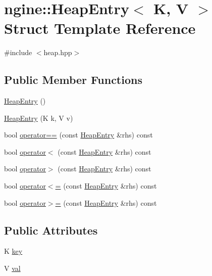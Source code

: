 \hypertarget{structngine_1_1HeapEntry}{}\section{ngine\+:\+:Heap\+Entry$<$ K, V $>$ Struct Template Reference}
\label{structngine_1_1HeapEntry}


{\ttfamily \#include $<$heap.\+hpp$>$}

\subsection*{Public Member Functions}
\begin{DoxyCompactItemize}
\item 
\hyperlink{structngine_1_1HeapEntry_ab9fa6e6538f3b1ae5e954d1b27b0e2b3}{Heap\+Entry} ()
\item 
\hyperlink{structngine_1_1HeapEntry_a1316695b4e7b38c1d23f503e2cc53faf}{Heap\+Entry} (K k, V v)
\item 
bool \hyperlink{structngine_1_1HeapEntry_a7570baae4b55e024f1b111e8bd92be77}{operator==} (const \hyperlink{structngine_1_1HeapEntry}{Heap\+Entry} \&rhs) const
\item 
bool \hyperlink{structngine_1_1HeapEntry_aeb5c971824a3b25ad8843ce80f2600eb}{operator$<$} (const \hyperlink{structngine_1_1HeapEntry}{Heap\+Entry} \&rhs) const
\item 
bool \hyperlink{structngine_1_1HeapEntry_ae8297988ca0d41e75e890e738b691783}{operator$>$} (const \hyperlink{structngine_1_1HeapEntry}{Heap\+Entry} \&rhs) const
\item 
bool \hyperlink{structngine_1_1HeapEntry_a2e385bab83f06e8098b7bbbbf30411b5}{operator$<$=} (const \hyperlink{structngine_1_1HeapEntry}{Heap\+Entry} \&rhs) const
\item 
bool \hyperlink{structngine_1_1HeapEntry_a31f6b917e1537f997cb4976110af2d2a}{operator$>$=} (const \hyperlink{structngine_1_1HeapEntry}{Heap\+Entry} \&rhs) const
\end{DoxyCompactItemize}
\subsection*{Public Attributes}
\begin{DoxyCompactItemize}
\item 
K \hyperlink{structngine_1_1HeapEntry_abfd2e1cf093aced3d57a7892127c3d88}{key}
\item 
V \hyperlink{structngine_1_1HeapEntry_a4b3d62cb43639d79fa71ed6e01ca6975}{val}
\end{DoxyCompactItemize}
